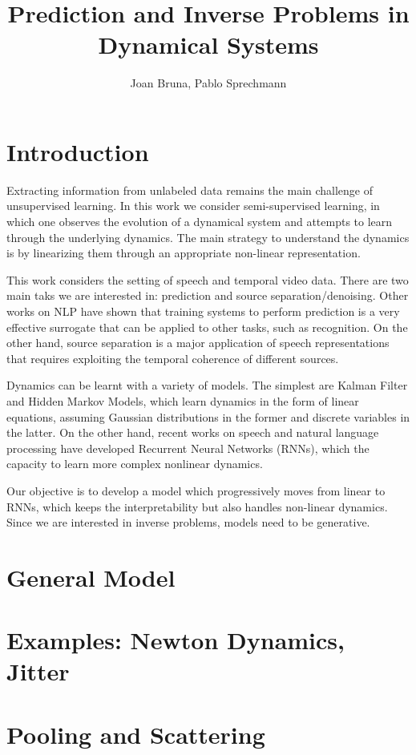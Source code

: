 \documentclass[11pt]{article} %
\title{Prediction and Inverse Problems in Dynamical Systems}
\author{Joan Bruna, Pablo Sprechmann}
\begin{document}
\maketitle

\section*{Introduction}

Extracting information from unlabeled data remains the main challenge of unsupervised learning. 
In this work we consider semi-supervised learning, in which one observes the evolution of a dynamical system 
and attempts to learn through the underlying dynamics. 
The main strategy to understand the dynamics is by linearizing them through an appropriate non-linear representation.

This work considers the setting of speech and temporal video data. 
There are two main taks we are interested in: prediction and source separation/denoising. 
Other works on NLP have shown that training systems to perform prediction is a very effective surrogate that 
can be applied to other tasks, such as recognition. On the other hand, source separation is a major application
of speech representations that requires exploiting the temporal coherence of different sources. 

Dynamics can be learnt with a variety of models. The simplest are Kalman Filter and Hidden Markov Models, which
learn dynamics in the form of linear equations, assuming Gaussian distributions in the former and discrete variables in the latter. 
On the other hand, recent works on speech and natural language processing have developed Recurrent Neural Networks (RNNs), 
which the capacity to learn more complex nonlinear dynamics. 

Our objective is to develop a model which progressively moves from linear to RNNs, which keeps the interpretability but also 
handles non-linear dynamics. 
Since we are interested in inverse problems, models need to be generative. 

\section{General Model}


\section{Examples: Newton Dynamics, Jitter}


\section{Pooling and Scattering}
\end{document}
